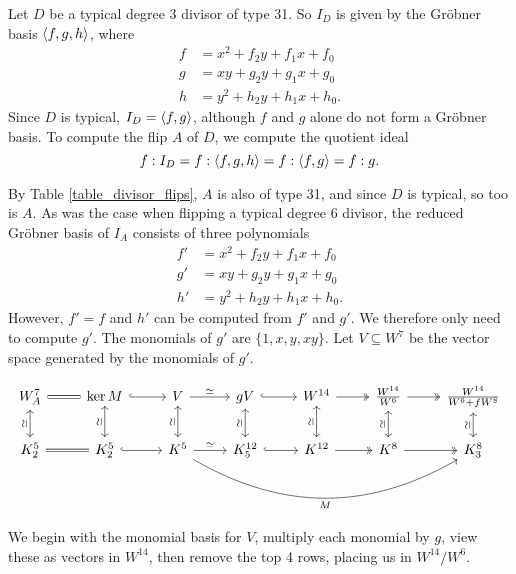 Let $D$ be a typical degree 3 divisor of type 31.
So $I_D$ is given by the Gr\"obner basis $\left\langle f,g,h \right\rangle$, where
\begin{align*}
  f  &= x^2 + f_2y + f_1x + f_0 \\
  g  &= xy  + g_2y + g_1x + g_0 \\
  h  &= y^2 + h_2y + h_1x + h_0.
\end{align*}
Since $D$ is typical, $I_D = \left\langle f,g \right\rangle$, although $f$ and $g$ alone do not form a Gr\"obner basis.
To compute the flip $A$ of $D$, we compute the quotient ideal
  \[ f : I_D = f : \left\langle f,g,h \right\rangle = f : \left\langle f,g \right\rangle = f : g. \]

By Table \ref{table_divisor_flips}, $A$ is also of type 31, and since $D$ is typical, so too is $A$.
As was the case when flipping a typical degree 6 divisor,
the reduced Gr\"obner basis of $I_A$ consists of three polynomials
\begin{align*}
  f' &= x^2 + f_2y + f_1x + f_0 \\
  g' &=  xy + g_2y + g_1x + g_0 \\
  h' &= y^2 + h_2y + h_1x + h_0.
\end{align*}
However, $f' = f$ and $h'$ can be computed from $f'$ and $g'$.
We therefore only need to compute $g'$.
The monomials of $g'$ are $\{1, x, y, xy\}$.
Let $V \subseteq W^7$ be the vector space generated by the monomials of $g'$.

\[ \begin{tikzcd}
  W_A^7 \arrow[equal]{r} \arrow[leftrightarrow,swap,"\rotatebox{90}{$\simeq$}"]{d}
    & \ker M \arrow[hook]{r} \arrow[leftrightarrow,swap,"\rotatebox{90}{$\simeq$}"]{d}
    & V \arrow["\simeq"]{r} \arrow[leftrightarrow,swap,"\rotatebox{90}{$\simeq$}"]{d}
    & gV \arrow[hook]{r} \arrow[leftrightarrow,swap,"\rotatebox{90}{$\simeq$}"]{d}
    & W^{14} \arrow[two heads]{r} \arrow[leftrightarrow,swap,"\rotatebox{90}{$\simeq$}"]{d}
    & \frac{W^{14}}{W^6} \arrow[two heads]{r} \arrow[leftrightarrow,swap,"\rotatebox{90}{$\simeq$}"]{d}
    & \frac{W^{14}}{W^6 + fW^8}  \arrow[leftrightarrow,swap,"\rotatebox{90}{$\simeq$}"]{d} \\
   K_2^5 \arrow[equal]{r}
    & K_2^5 \arrow[hook]{r}
    & K^5 \arrow["\simeq"]{r} \arrow[bend right,swap,"M"]{rrrr}
    & K_5^{12} \arrow[hook]{r}
    & K^{12} \arrow[two heads]{r}
    & K^8 \arrow[two heads]{r}
    & K_3^8 
\end{tikzcd} \]

We begin with the monomial basis for $V$,
multiply each monomial by $g$,
view these as vectors in $W^{14}$,
then remove the top 4 rows, placing us in $W^{14}/W^6$.


